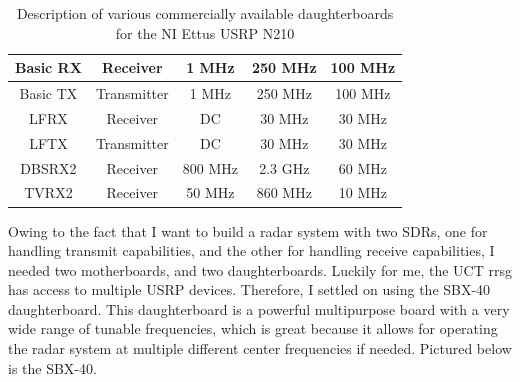 \documentclass[11pt]{report}
\begin{document}
\begin{table}[H]
\begin{tabular}{|c|c|c|c|c|}
Basic RX               & Receiver          & 1 MHz                                                     & 250 MHz                                                   & 100 MHz                                                                         \\ \hline
Basic TX               & Transmitter       & 1 MHz                                                     & 250 MHz                                                   & 100 MHz                                                                         \\ \hline
LFRX                   & Receiver          & DC                                                        & 30 MHz                                                    & 30 MHz                                                                          \\ \hline
LFTX                   & Transmitter       & DC                                                        & 30 MHz                                                    & 30 MHz                                                                          \\ \hline
DBSRX2                 & Receiver          & 800 MHz                                                   & 2.3 GHz                                                   & 60 MHz                                                                          \\ \hline
TVRX2                  & Receiver          & 50 MHz                                                    & 860 MHz                                                   & 10 MHz                                                                          \\ \hline
\end{tabular}
\caption{Description of various commercially available daughterboards for the NI Ettus USRP N210}
\label{tab:ni_ettus_daughterboards}
\end{table}


Owing to the fact that I want to build a radar system with two SDRs, one for handling transmit capabilities, and the other for handling receive capabilities, I needed two motherboards, and two daughterboards. Luckily for me, the UCT \gls{rrsg} has access to multiple USRP devices. Therefore, I settled on using the SBX-40 daughterboard. This daughterboard is a powerful multipurpose board with a very wide range of tunable frequencies, which is great because it allows for operating the radar system at multiple different center frequencies if needed. Pictured below is the SBX-40.
\end{document}
